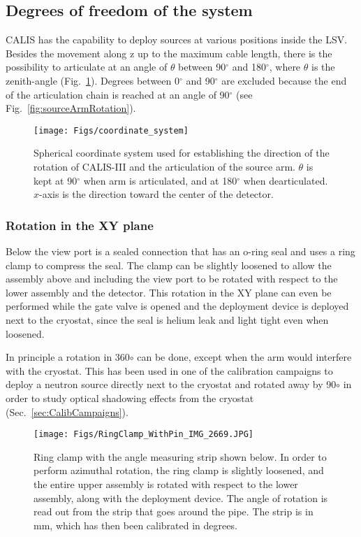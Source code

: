\subsection{Degrees of freedom of the system}

CALIS has the capability to deploy sources at various positions inside the LSV. Besides the movement along z up to the maximum cable length, there is the possibility to articulate at an angle of $\theta$ between 90$^{\circ}$ and 180$^{\circ}$, where $\theta$ is the zenith-angle (Fig.~\ref{fig:coordinate_system}). Degrees between 0$^{\circ}$ and 90$^{\circ}$ are excluded because the end of the articulation chain is reached at an angle of 90$^{\circ}$ (see Fig.~\ref{fig:sourceArmRotation}).

\begin{figure}[htbp]
 \centering
  \texttt{[image: Figs/coordinate\_system]}
  \caption{Spherical coordinate system used for establishing the direction of the rotation of CALIS-III and the articulation of the source arm. $\theta$ is kept at 90$^{\circ}$ when arm is articulated, and at 180$^{\circ}$ when dearticulated. $x$-axis is the direction toward the center of the detector. }
  \label{fig:coordinate_system}
\end{figure} 

\subsubsection{Rotation in the XY plane}
Below the view port is a sealed connection that has an o-ring seal and uses a ring clamp to compress the seal. The clamp can be slightly loosened to allow the assembly above and including the view port to be rotated with respect to the lower assembly and the detector. This rotation in the XY plane can even be performed while the gate valve is opened and the deployment device is deployed next to the cryostat, since the seal is helium leak and light tight even when loosened.

In principle a rotation in 360$\circ$ can be done, except when the arm would interfere with the cryostat. This has been used in one of the calibration campaigns to deploy a neutron source directly next to the cryostat and rotated away by 90$\circ$ in order to study optical shadowing effects from the cryostat (Sec.~\ref{sec:CalibCampaigns}). 



\begin{figure}[htbp]
 \centering
  \texttt{[image: Figs/RingClamp\_WithPin\_IMG\_2669.JPG]}
  \caption{Ring clamp  with the angle measuring strip shown below. In order to perform azimuthal rotation, the ring clamp is slightly loosened, and the entire upper assembly is rotated with respect to the lower assembly, along with the deployment device. The angle of rotation is read out from the strip that goes around the pipe. The strip is in mm, which has then been calibrated in degrees.}
  \label{fig:ring_clamp}
\end{figure} 

